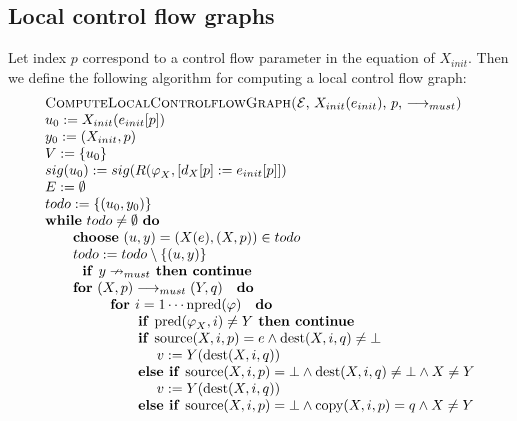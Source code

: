 \documentclass{article}
\begin{document}
\newpage

\subsection{Local control flow graphs}

Let index $p$ correspond to a control flow parameter in the equation of $%
X_{init}$. Then we define the following algorithm for computing a local
control flow graph:%
\begin{equation*}
\begin{tabular}{l}
\textsc{ComputeLocalControlflowGraph(}$\mathcal{E}$, $X_{init}(e_{init})$, $%
p $, $\longrightarrow _{must}$\textsc{)} \\ 
$u_{0}:=X_{init}(e_{init}[p])$ \\ 
$y_{0}:=(X_{init},p)$ \\ 
$V:=\{u_{0}\}$ \\ 
$sig(u_{0}):=sig(R(\varphi _{X},[d_{X}[p]:=e_{init}[p]])$ \\ 
$E:=\emptyset $ \\ 
$todo:=\{(u_{0},y_{0})\}$ \\ 
\textbf{while} $todo\neq \emptyset $ \textbf{do} \\ 
$\qquad $\textbf{choose} $(u,y)=(X(e),(X,p))\in todo$ \\ 
$\qquad todo:=todo\setminus \{(u,y)\}$ \\ 
$\qquad \text{\textbf{if }}y\nrightarrow _{must}$\textbf{\ then continue} \\ 
$\qquad $\textbf{for} $(X,p)\longrightarrow _{must}(Y,q)\text{ \textbf{do}}$
\\ 
$\qquad \qquad \text{\textbf{for }}i=1\cdots \mathrm{npred}(\varphi )\text{ 
\textbf{do}}$ \\ 
$\qquad \qquad \qquad \text{\textbf{if }}\mathrm{pred}(\varphi _{X},i)\neq Y$%
\textbf{\ then continue} \\ 
$\qquad \qquad \qquad \text{\textbf{if }}\mathrm{source}(X,i,p)=e\wedge 
\mathrm{dest}(X,i,q)\neq \bot $ \\ 
$\qquad \qquad \qquad \qquad v:=Y(\mathrm{dest}(X,i,q))$ \\ 
$\qquad \qquad \qquad \text{\textbf{else if }}\mathrm{source}(X,i,p)=\bot
\wedge \mathrm{dest}(X,i,q)\neq \bot \wedge X\neq Y$ \\ 
$\qquad \qquad \qquad \qquad v:=Y(\mathrm{dest}(X,i,q))$ \\ 
$\qquad \qquad \qquad \text{\textbf{else if }}\mathrm{source}(X,i,p)=\bot
\wedge \mathrm{copy}(X,i,p)=q\wedge X\neq Y$ \\ 

\end{tabular}
\end{equation*}
\end{document}
